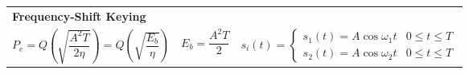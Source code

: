 \begin{tabular}{ p{6cm} p{2.5cm} p{9cm} }
		\multicolumn{3}{l}{\textbf{Frequency-Shift Keying}} \\
		$ P_e = Q\left(\sqrt{\dfrac{A^2 T}{2 \eta}}\right) = Q\left(\sqrt{\dfrac{E_b}{\eta}}\right) $
		& $ E_b = \dfrac{A^2 T}{2} $
		& $ s_i(t) = \begin{cases}
 		     s_1(t) = A \cos{\omega_1 t} & 0 \leq t \leq T \\       
 		     s_2(t) = A \cos{\omega_2 t} & 0 \leq t \leq T
 		   \end{cases}$ \\

 	\end{tabular}
	\renewcommand{\arraystretch}{\arraystretchOriginal}
